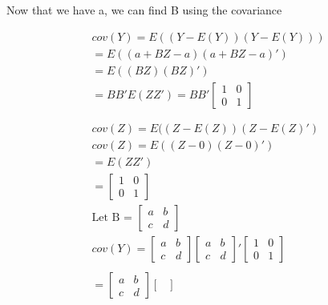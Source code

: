 \documentclass[oneside, a4paper]{article}
\begin{document}
Now that we have a, we can find B using the covariance


\begin{equation}
    \begin{split}
        cov(Y) = E((Y - E(Y)) (Y - E(Y))) \\
        = E((a + BZ - a) (a + BZ - a)') \\
        = E((BZ) (BZ)') \\
        = BB'E(ZZ') = BB' \begin{bmatrix}
            1 & 0 \\
            0 & 1 
        \end{bmatrix}\\ \\ \\
        cov(Z) = E((Z - E(Z)) (Z - E(Z)') \\
        cov(Z) = E((Z - 0) (Z - 0)') \\
        = E(ZZ') \\
        = \begin{bmatrix}
            1 & 0 \\
            0 & 1 
        \end{bmatrix}\\
        \text{Let B = } 
            \begin{bmatrix}
                a & b \\
                c & d 
            \end{bmatrix}\\
        cov(Y) = 
            \begin{bmatrix}
                a & b \\
                c & d 
            \end{bmatrix} 
            \begin{bmatrix}
                a & b \\
                c & d 
            \end{bmatrix} ' 
            \begin{bmatrix}
                1 & 0 \\
                0 & 1 
            \end{bmatrix} \\ \\
        = 
            \begin{bmatrix}
                a & b \\
                c & d 
            \end{bmatrix} 
            \begin{bmatrix}

\end{bmatrix}
\end{split}
\end{equation}
\end{document}
